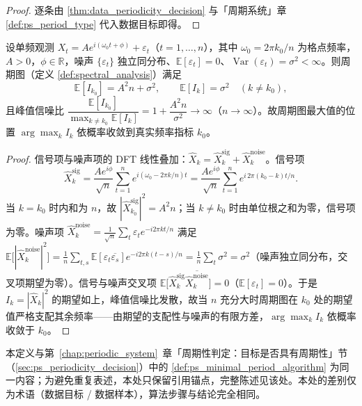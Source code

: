 \begin{proof}
逐条由 \cref{thm:data_periodicity_decision} 与「周期系统」章 \cref{def:ps_period_type} 代入数据目标即得。
\end{proof}

\begin{lemma}[周期图峰值检测的一致性]\label{ch31_periodogram_peak}
设单频观测 $X_t = A e^{i(\omega_0 t + \phi)} + \varepsilon_t$（$t = 1,\dots,n$），其中 $\omega_0 = 2\pi k_0 / n$ 为格点频率，$A > 0$，$\phi \in \mathbb{R}$，噪声 $\{\varepsilon_t\}$ 独立同分布、$\mathbb{E}[\varepsilon_t] = 0$、$\operatorname{Var}(\varepsilon_t) = \sigma^2 < \infty$。则周期图（定义 \ref{def:spectral_analysis}）满足
\[
\mathbb{E}[I_{k_0}] = A^2 n + \sigma^2, \qquad \mathbb{E}[I_k] = \sigma^2 \quad (k \neq k_0),
\]
且峰值信噪比 $\dfrac{\mathbb{E}[I_{k_0}]}{\max_{k \neq k_0} \mathbb{E}[I_k]} = 1 + \dfrac{A^2 n}{\sigma^2} \to \infty$（$n \to \infty$）。故周期图最大值的位置 $\arg\max_k I_k$ 依概率收敛到真实频率指标 $k_0$。
\end{lemma}

\begin{proof}
信号项与噪声项的 DFT 线性叠加：$\hat{X}_k = \hat{X}_k^{\text{sig}} + \hat{X}_k^{\text{noise}}$。信号项
\[
\hat{X}_k^{\text{sig}} = \frac{A e^{i\phi}}{\sqrt{n}} \sum_{t=1}^{n} e^{i(\omega_0 - 2\pi k/n)t} = \frac{A e^{i\phi}}{\sqrt{n}} \sum_{t=1}^{n} e^{i\,2\pi(k_0 - k)t/n}.
\]
当 $k = k_0$ 时内和为 $n$，故 $|\hat{X}_{k_0}^{\text{sig}}|^2 = A^2 n$；当 $k \neq k_0$ 时由单位根之和为零，信号项为零。噪声项 $\hat{X}_k^{\text{noise}} = \frac{1}{\sqrt{n}}\sum_t \varepsilon_t e^{-i2\pi kt/n}$ 满足 $\mathbb{E}\big[|\hat{X}_k^{\text{noise}}|^2\big] = \frac{1}{n}\sum_{t,s} \mathbb{E}[\varepsilon_t \overline{\varepsilon_s}] e^{-i2\pi k(t-s)/n} = \frac{1}{n}\sum_t \sigma^2 = \sigma^2$（噪声独立同分布，交叉项期望为零）。信号与噪声交叉项 $\mathbb{E}\big[\hat{X}_k^{\text{sig}}\overline{\hat{X}_k^{\text{noise}}}\big] = 0$（$\mathbb{E}[\varepsilon_t] = 0$）。于是 $I_k = |\hat{X}_k|^2$ 的期望如上，峰值信噪比发散，故当 $n$ 充分大时周期图在 $k_0$ 处的期望值严格支配其余频率——由期望的支配性与噪声的有限方差，$\arg\max_k I_k$ 依概率收敛于 $k_0$。
\end{proof}

\begin{definition}[数据最小正周期算法]\label{def:data_minimal_period_algorithm}
本定义与第~\ref{chap:periodic_system}~章「周期性判定：目标是否具有周期性」节（\cref{sec:ps_periodicity_decision}）中的 \cref{def:ps_minimal_period_algorithm} 为同一内容；为避免重复表述，本处只保留引用锚点，完整陈述见该处。本处的差别仅为术语（数据目标 / 数据样本），算法步骤与结论完全相同。
\end{definition}

